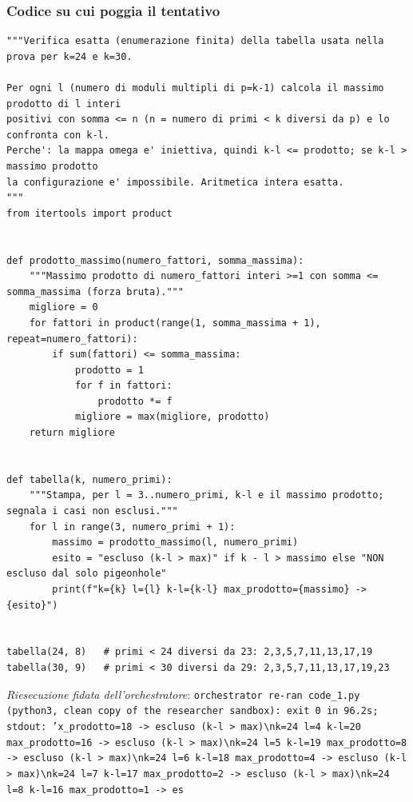 \documentclass[11pt,a4paper]{article}
\begin{document}
\subsubsection{Codice su cui poggia il tentativo}
\begin{lstlisting}[caption={attempt\_001 code\_1 [python, rigore exact] — Exact brute-force confirmation of the counting table used in Step 4c: for l = 3..|R| the m — verdetto del Referee: REJECT}]
"""Verifica esatta (enumerazione finita) della tabella usata nella prova per k=24 e k=30.

Per ogni l (numero di moduli multipli di p=k-1) calcola il massimo prodotto di l interi
positivi con somma <= n (n = numero di primi < k diversi da p) e lo confronta con k-l.
Perche': la mappa omega e' iniettiva, quindi k-l <= prodotto; se k-l > massimo prodotto
la configurazione e' impossibile. Aritmetica intera esatta.
"""
from itertools import product


def prodotto_massimo(numero_fattori, somma_massima):
    """Massimo prodotto di numero_fattori interi >=1 con somma <= somma_massima (forza bruta)."""
    migliore = 0
    for fattori in product(range(1, somma_massima + 1), repeat=numero_fattori):
        if sum(fattori) <= somma_massima:
            prodotto = 1
            for f in fattori:
                prodotto *= f
            migliore = max(migliore, prodotto)
    return migliore


def tabella(k, numero_primi):
    """Stampa, per l = 3..numero_primi, k-l e il massimo prodotto; segnala i casi non esclusi."""
    for l in range(3, numero_primi + 1):
        massimo = prodotto_massimo(l, numero_primi)
        esito = "escluso (k-l > max)" if k - l > massimo else "NON escluso dal solo pigeonhole"
        print(f"k={k} l={l} k-l={k-l} max_prodotto={massimo} -> {esito}")


tabella(24, 8)   # primi < 24 diversi da 23: 2,3,5,7,11,13,17,19
tabella(30, 9)   # primi < 30 diversi da 29: 2,3,5,7,11,13,17,19,23

\end{lstlisting}
\noindent\emph{Riesecuzione fidata dell'orchestratore}: \texttt{orchestrator re-ran code\_1.py (python3, clean copy of the researcher sandbox): exit 0 in 96.2s; stdout: 'x\_prodotto=18 -\textgreater{} escluso (k-l \textgreater{} max)\textbackslash{}nk=24 l=4 k-l=20 max\_prodotto=16 -\textgreater{} escluso (k-l \textgreater{} max)\textbackslash{}nk=24 l=5 k-l=19 max\_prodotto=8 -\textgreater{} escluso (k-l \textgreater{} max)\textbackslash{}nk=24 l=6 k-l=18 max\_prodotto=4 -\textgreater{} escluso (k-l \textgreater{} max)\textbackslash{}nk=24 l=7 k-l=17 max\_prodotto=2 -\textgreater{} escluso (k-l \textgreater{} max)\textbackslash{}nk=24 l=8 k-l=16 max\_prodotto=1 -\textgreater{} es}
\end{document}
